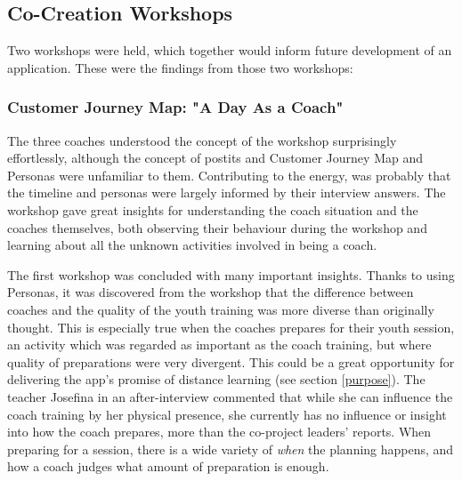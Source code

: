 \subsection{Co-Creation Workshops}


    Two workshops were held, which together would inform future development of an application. These were the findings from those two workshops:

    \subsubsection{Customer Journey Map: "A Day As a Coach"}




    The three coaches understood the concept of the workshop surprisingly effortlessly, although the concept of postits and Customer Journey Map and Personas were unfamiliar to them. Contributing to the energy, was probably that the timeline and personas were largely informed by their interview answers. The workshop gave great insights for understanding the coach situation and the coaches themselves, both observing their behaviour during the workshop and learning about all the unknown activities involved in being a coach.

    The first workshop was concluded with many important insights. Thanks to using Personas, it was discovered from the workshop that the difference between coaches and the quality of the youth training was more diverse than originally thought. This is especially true when the coaches prepares for their youth session, an activity which was regarded as important as the coach training, but where quality of preparations were very divergent. This could be a great opportunity for delivering the app's promise of distance learning (see section \ref{purpose}). The teacher Josefina in an after-interview commented that while she can influence the coach training by her physical presence, she currently has no influence or insight into how the coach prepares, more than the co-project leaders' reports. When preparing for a session, there is a wide variety of \textit{when} the planning happens, and how a coach judges what amount of preparation is enough.

